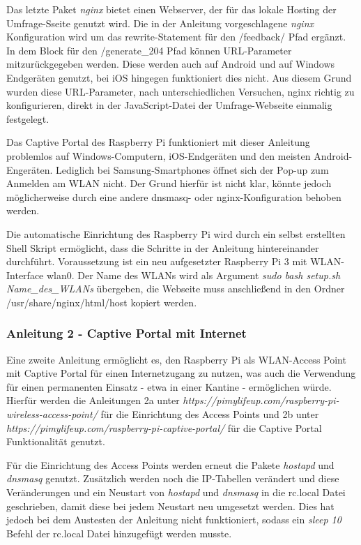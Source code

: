 Das letzte Paket \textit{nginx} bietet einen Webserver, der für das lokale Hosting der Umfrage-Sseite genutzt wird. Die in der Anleitung vorgeschlagene \textit{nginx} Konfiguration wird um das rewrite-Statement für den /feedback/ Pfad ergänzt. In dem Block für den /generate\_204 Pfad können URL-Parameter mitzurückgegeben werden. Diese werden auch auf Android und auf Windows Endgeräten genutzt, bei iOS hingegen funktioniert dies nicht. Aus diesem Grund wurden diese URL-Parameter, nach unterschiedlichen Versuchen, nginx richtig zu konfigurieren, direkt in der JavaScript-Datei der Umfrage-Webseite einmalig festgelegt.

Das Captive Portal des Raspberry Pi funktioniert mit dieser Anleitung problemlos auf Windows-Computern, iOS-Endgeräten und den meisten Android-Engeräten. Lediglich bei Samsung-Smartphones öffnet sich der Pop-up zum Anmelden am WLAN nicht. Der Grund hierfür ist nicht klar, könnte jedoch möglicherweise durch eine andere dnsmasq- oder nginx-Konfiguration behoben werden.

Die automatische Einrichtung des Raspberry Pi wird durch ein selbst erstellten Shell Skript ermöglicht, dass die Schritte in der Anleitung hintereinander durchführt. Voraussetzung ist ein neu aufgesetzter Raspberry Pi 3 mit WLAN-Interface wlan0. Der Name des WLANs wird als Argument \textit{sudo bash setup.sh Name\_des\_WLANs} übergeben, die Webseite muss anschließend in den Ordner /usr/share/nginx/html/host kopiert werden.

\subsubsection*{Anleitung 2 - Captive Portal mit Internet}
Eine zweite Anleitung ermöglicht es, den Raspberry Pi als WLAN-Access Point mit Captive Portal für einen Internetzugang zu nutzen, was auch die Verwendung für einen permanenten Einsatz - etwa in einer Kantine - ermöglichen würde. Hierfür werden die Anleitungen 2a unter \textit{https://pimylifeup.com/raspberry-pi-wireless-access-point/} für die Einrichtung des Access Points und 2b unter \textit{https://pimylifeup.com/raspberry-pi-captive-portal/} für die Captive Portal Funktionalität genutzt.

Für die Einrichtung des Access Points werden erneut die Pakete \textit{hostapd} und \textit{dnsmasq} genutzt. Zusätzlich werden noch die IP-Tabellen verändert und diese Veränderungen und ein Neustart von \textit{hostapd} und \textit{dnsmasq} in die rc.local Datei geschrieben, damit diese bei jedem Neustart neu umgesetzt werden. Dies hat jedoch bei dem Austesten der Anleitung nicht funktioniert, sodass ein \textit{sleep 10} Befehl der rc.local Datei hinzugefügt werden musste.

